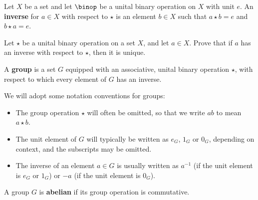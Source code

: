 \todo{}

\begin{definition}
\label{defInverseElement}
Let $X$ be a set and let $\binop$ be a unital binary operation on $X$ with unit $e$. An \textbf{inverse} for $a \in X$ with respect to $\star$ is an element $b \in X$ such that $a \star b = e$ and $b \star a = e$.
\end{definition}

\begin{example}
\todo{}
\end{example}

\begin{exercise}
\todo{}
\end{exercise}

\begin{example}
Let $\star$ be a unital binary operation on a set $X$, and let $a \in X$. Prove that if $a$ has an inverse with respect to $\star$, then it is unique.
\end{example}

\todo{}

\begin{definition}
\label{defGroup}
A \textbf{group} is a set $G$ equipped with an associative, unital binary operation $\star$, with respect to which every element of $G$ has an inverse.
\end{definition}

We will adopt some notation conventions for groups:
\begin{itemize}
\item The group operation $\star$ will often be omitted, so that we write $ab$ to mean $a \star b$.
\item The unit element of $G$ will typically be written as $e_G$, $1_G$ or $0_G$, depending on context, and the subscripts may be omitted.
\item The inverse of an element $a \in G$ is usually written as $a^{-1}$ (if the unit element is $e_G$ or $1_G$) or $-a$ (if the unit element is $0_G$).
\end{itemize}

\todo{}

\begin{definition}
\label{defAbelianGroup}
A group $G$ is \textbf{abelian} if its group operation is commutative.
\end{definition}

\begin{example}
\todo{}
\end{example}

\begin{example}
\todo{}
\end{example}

\begin{exercise}
\todo{}
\end{exercise}


